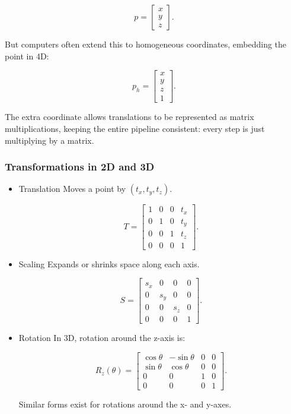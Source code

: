 \documentclass[
  letterpaper,
  DIV=11,
  numbers=noendperiod]{scrreprt}
\begin{document}
\[
p = \begin{bmatrix} x \\ y \\ z \end{bmatrix}.
\]

But computers often extend this to homogeneous coordinates, embedding
the point in 4D:

\[
p_h = \begin{bmatrix} x \\ y \\ z \\ 1 \end{bmatrix}.
\]

The extra coordinate allows translations to be represented as matrix
multiplications, keeping the entire pipeline consistent: every step is
just multiplying by a matrix.

\subsubsection{Transformations in 2D and
3D}\label{transformations-in-2d-and-3d}

\begin{itemize}
\item
  Translation Moves a point by \((t_x, t_y, t_z)\).

  \[
  T = \begin{bmatrix} 
  1 & 0 & 0 & t_x \\ 
  0 & 1 & 0 & t_y \\ 
  0 & 0 & 1 & t_z \\ 
  0 & 0 & 0 & 1 
  \end{bmatrix}.
  \]
\item
  Scaling Expands or shrinks space along each axis.

  \[
  S = \begin{bmatrix} 
  s_x & 0 & 0 & 0 \\ 
  0 & s_y & 0 & 0 \\ 
  0 & 0 & s_z & 0 \\ 
  0 & 0 & 0 & 1 
  \end{bmatrix}.
  \]
\item
  Rotation In 3D, rotation around the z-axis is:

  \[
  R_z(\theta) = \begin{bmatrix} 
  \cos\theta & -\sin\theta & 0 & 0 \\ 
  \sin\theta & \cos\theta & 0 & 0 \\ 
  0 & 0 & 1 & 0 \\ 
  0 & 0 & 0 & 1 
  \end{bmatrix}.
  \]

  Similar forms exist for rotations around the x- and y-axes.
\end{itemize}
\end{document}
